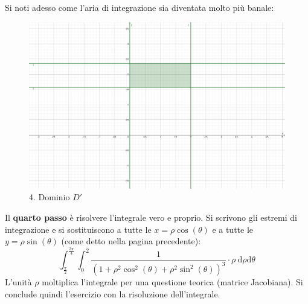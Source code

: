 \documentclass[a4paper]{article}
\begin{document}
	\noindent
	Si noti adesso come l'aria di integrazione sia diventata molto più banale:
	\begin{figure}[!htp]
		\centering
		\includegraphics[width=.7\textwidth]{img/grafico-ex6-4.pdf}
		\caption*{4. Dominio $D'$}
	\end{figure}

	\noindent
	Il \textbf{quarto passo} è risolvere l'integrale vero e proprio. Si scrivono gli estremi di integrazione e si sostituiscono a tutte le $x=\rho\cos\left(\theta\right)$ e a tutte le $y=\rho\sin\left(\theta\right)$ (come detto nella pagina precedente):
	\begin{equation*}
		\displaystyle\int_{\frac{\pi}{2}}^{\frac{3\pi}{4}} \int_{0}^{2} \dfrac{1}{\left(1+ \rho^{2}\cos^{2}\left(\theta\right) + \rho^{2}\sin^{2}\left(\theta\right)\right)^{3}} \cdot \rho \: \mathrm{d}\rho\mathrm{d}\theta
	\end{equation*}
	L'unità $\rho$ moltiplica l'integrale per una questione teorica (matrice Jacobiana). Si conclude quindi l'esercizio con la risoluzione dell'integrale.\newpage 
	
\end{document}
